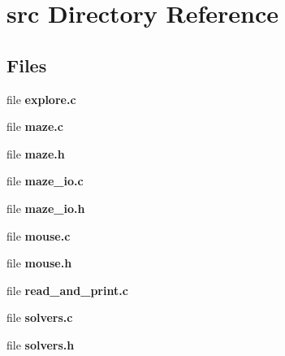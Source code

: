 \section{src Directory Reference}
\label{dir_68267d1309a1af8e8297ef4c3efbcdba}
\subsection*{Files}
\begin{DoxyCompactItemize}
\item 
file {\bf explore.\-c}
\item 
file {\bf maze.\-c}
\item 
file {\bf maze.\-h}
\item 
file {\bf maze\-\_\-io.\-c}
\item 
file {\bf maze\-\_\-io.\-h}
\item 
file {\bf mouse.\-c}
\item 
file {\bf mouse.\-h}
\item 
file {\bf read\-\_\-and\-\_\-print.\-c}
\item 
file {\bf solvers.\-c}
\item 
file {\bf solvers.\-h}
\end{DoxyCompactItemize}
